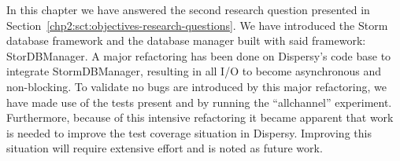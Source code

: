 In this chapter we have answered the second research question presented in Section~\ref{chp2:sct:objectives-research-questions}.
We have introduced the Storm database framework and the database manager built with said framework: StorDBManager.
A major refactoring has been done on Dispersy's code base to integrate StormDBManager, resulting in all I/O to become asynchronous and non-blocking.
To validate no bugs are introduced by this major refactoring, we have made use of the tests present and by running the \enquote{allchannel} experiment.
Furthermore, because of this intensive refactoring it became apparent that work is needed to improve the test coverage situation in Dispersy.
Improving this situation will require extensive effort and is noted as future work.
 
